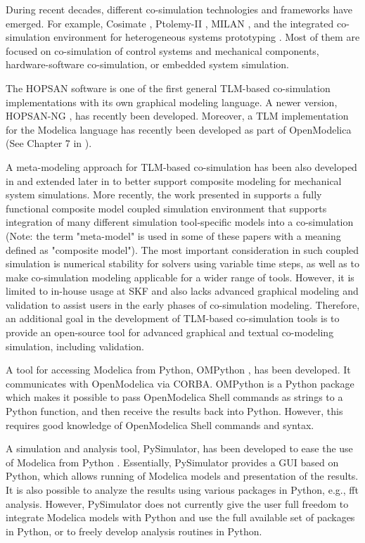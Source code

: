During recent decades, different co-simulation technologies and frameworks have emerged. For example, Cosimate \cite{tnisoftware}, Ptolemy-II \cite{cosimulationptolemy}, MILAN \cite{cosimulationmilan}, and the integrated co-simulation environment for heterogeneous systems prototyping \cite{cosimulationyongjoo}. Most of them are focused on co-simulation of control systems and mechanical components, hardware-software co-simulation, or embedded system simulation. 

The HOPSAN \cite{hopsanusersguide} software is one of the first general TLM-based co-simulation implementations with its own graphical modeling language. A newer version, HOPSAN-NG \cite{hospanaxin}, has recently been developed. Moreover, a TLM implementation for the Modelica language has recently been developed as part of OpenModelica (See Chapter 7 in \cite{tlmmartin}).

A meta-modeling approach for TLM-based co-simulation has been also developed in \cite{tlmalexander05} and extended later in \cite{tlmsiemers06,tlmsiemers07} to better support composite modeling for mechanical system simulations. More recently, the work presented in \cite{tlmsiemers09} supports a fully functional composite model coupled simulation environment that supports integration of many different simulation tool-specific models into a co-simulation (Note: the term "meta-model" is used in some of these papers with a meaning defined as "composite model"). The most important consideration in such coupled simulation is numerical stability for solvers using variable time steps, as well as to make co-simulation modeling applicable for a wider range of tools. However, it is limited to in-house usage at SKF and also lacks advanced graphical modeling and validation to assist users in the early phases of co-simulation modeling. Therefore, an additional goal in the development of TLM-based co-simulation tools is to provide an open-source tool for advanced graphical and textual co-modeling simulation, including validation.

A tool for accessing Modelica from Python, OMPython \cite{ompythonanandthesis}, has been developed. It communicates with OpenModelica via CORBA. OMPython is a Python package which makes it possible to pass OpenModelica Shell commands as strings to a Python function, and then receive the results back into Python. However, this requires good knowledge of OpenModelica Shell commands and syntax. 

A simulation and analysis tool, PySimulator, has been developed to ease the use of Modelica from Python \cite{pysimulator}. Essentially, PySimulator provides a GUI based on Python, which allows running of Modelica models and presentation of the results. It is also possible to analyze the results using various packages in Python, e.g., \acrshort{fft} analysis. However, PySimulator does not currently give the user full freedom to integrate Modelica models with Python and use the full available set of packages in Python, or to freely develop analysis routines in Python.


